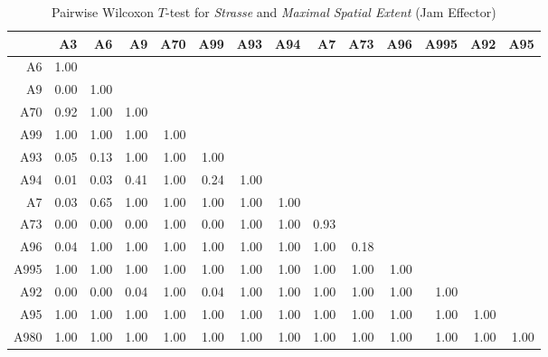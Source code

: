 \begin{table}[ht]
	\tiny
	\centering
	\begin{tabular}{rrrrrrrrrrrrrr}
		\toprule
			 & A3 & A6 & A9 & A70 & A99 & A93 & A94 & A7 & A73 & A96 & A995 & A92 & A95 \\ 
		\midrule
		A6   & 1.00 &  &  &  &  &  &  &  &  &  &  &  &  \\ 
		A9   & 0.00 & 1.00 &  &  &  &  &  &  &  &  &  &  &  \\ 
		A70  & 0.92 & 1.00 & 1.00 &  &  &  &  &  &  &  &  &  &  \\ 
		A99  & 1.00 & 1.00 & 1.00 & 1.00 &  &  &  &  &  &  &  &  &  \\ 
		A93  & 0.05 & 0.13 & 1.00 & 1.00 & 1.00 &  &  &  &  &  &  &  &  \\ 
		A94  & 0.01 & 0.03 & 0.41 & 1.00 & 0.24 & 1.00 &  &  &  &  &  &  &  \\ 
		A7   & 0.03 & 0.65 & 1.00 & 1.00 & 1.00 & 1.00 & 1.00 &  &  &  &  &  &  \\ 
		A73  & 0.00 & 0.00 & 0.00 & 1.00 & 0.00 & 1.00 & 1.00 & 0.93 &  &  &  &  &  \\ 
		A96  & 0.04 & 1.00 & 1.00 & 1.00 & 1.00 & 1.00 & 1.00 & 1.00 & 0.18 &  &  &  &  \\ 
		A995 & 1.00 & 1.00 & 1.00 & 1.00 & 1.00 & 1.00 & 1.00 & 1.00 & 1.00 & 1.00 &  &  &  \\ 
		A92  & 0.00 & 0.00 & 0.04 & 1.00 & 0.04 & 1.00 & 1.00 & 1.00 & 1.00 & 1.00 & 1.00 &  &  \\ 
		A95  & 1.00 & 1.00 & 1.00 & 1.00 & 1.00 & 1.00 & 1.00 & 1.00 & 1.00 & 1.00 & 1.00 & 1.00 &  \\ 
		A980 & 1.00 & 1.00 & 1.00 & 1.00 & 1.00 & 1.00 & 1.00 & 1.00 & 1.00 & 1.00 & 1.00 & 1.00 & 1.00 \\ 
		\bottomrule
	  \end{tabular}
    \caption{Pairwise Wilcoxon $T$-test for \textit{Strasse} and \textit{Maximal Spatial Extent} (Jam Effector)}
    \label{tbl:wilcoxon_baysis_effector_Strasse_SMax}
\end{table}
